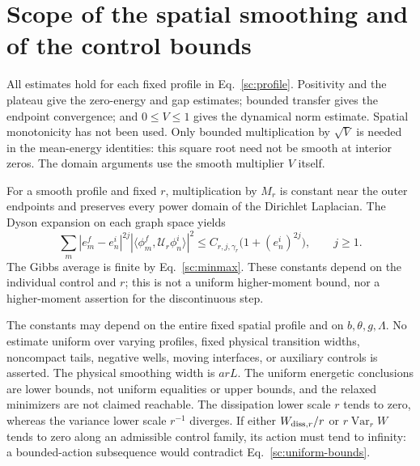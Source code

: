 \documentclass[aps,prl,reprint,superscriptaddress,longbibliography]{revtex4-2}
\begin{document}
\section{Scope of the spatial smoothing and of the control bounds}
All estimates hold for each fixed profile in Eq.~\eqref{sc:profile}.
Positivity and the plateau give the zero-energy and gap estimates;
bounded transfer gives the endpoint convergence; and $0\le V\le1$ gives
the dynamical norm estimate. Spatial monotonicity has not been used.
Only bounded multiplication by $\sqrt V$ is needed in the mean-energy
identities: this square root need not be smooth at interior zeros.
The domain arguments use the smooth multiplier $V$ itself.

For a smooth profile and fixed $r$, multiplication by $M_r$ is constant
near the outer endpoints and preserves every power domain of the
Dirichlet Laplacian. The Dyson expansion on each graph space yields
\[
\sum_m |e_m^f-e_n^i|^{2j}
 |\langle\phi_m^f,\mathcal U_r\phi_n^i\rangle|^2
 \le C_{r,j,\gamma_r}\bigl(1+(e_n^i)^{2j}\bigr),\qquad j\ge1.
\]
The Gibbs average is finite by Eq.~\eqref{sc:minmax}. These constants
depend on the individual control and $r$; this is not a uniform
higher-moment bound, nor a higher-moment assertion for the discontinuous
step.

The constants may depend on the entire fixed spatial profile and on
$b,\theta,g,\Lambda$. No estimate uniform over varying profiles, fixed
physical transition widths, noncompact tails, negative wells, moving
interfaces, or auxiliary controls is asserted. The physical smoothing
width is $arL$. The uniform energetic conclusions are lower bounds,
not uniform equalities or upper bounds, and the relaxed minimizers are
not claimed reachable. The dissipation lower scale $r$ tends to zero,
whereas the variance lower scale $r^{-1}$ diverges. If either
$W_{{\rm diss},r}/r$ or $r\operatorname{Var}_rW$ tends to zero along an
admissible control family, its action must tend to infinity: a
bounded-action subsequence would contradict Eq.~\eqref{sc:uniform-bounds}.
\end{document}
